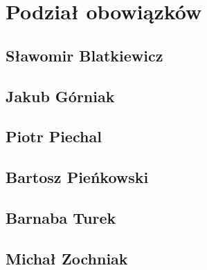 ﻿\section{Podział obowiązków}
\subsection{Sławomir Blatkiewicz}

\subsection{Jakub Górniak}

\subsection{Piotr Piechal}

\subsection{Bartosz Pieńkowski}

\subsection{Barnaba Turek}

\subsection{Michał Zochniak}

